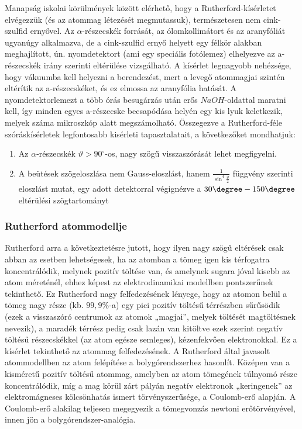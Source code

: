 \documentclass[a4paper,12pt]{article}
\begin{document}
Manapság iskolai körülmények között elérhető, hogy a Rutherford-kísérletet
elvégezzük (és az atommag létezését megmutassuk), természetesen nem
cink-szulfid ernyővel.
Az $\alpha$-részecskék forrását, az ólomkollimátort és az aranyfóliát
ugyanúgy alkalmazva, de a cink-szulfid ernyő helyett egy félkör alakban meghajlított, ún. nyomdetektort (ami egy speciális fotólemez)
elhelyezve az a-részecskék irány szerinti eltérülése vizsgálható. A kísérlet
legnagyobb nehézsége, hogy vákuumba kell helyezni a berendezést, mert
a levegő atommagjai szintén eltérítik az a-részecskéket, és ez elmossa az
aranyfólia hatását. A nyomdetektorlemezt a több órás besugárzás után erős
$NaOH$-oldattal maratni kell, így minden egyes a-részecske becsapódása helyén egy kis lyuk keletkezik, melyek száma mikroszkóp alatt megszámolható.
Összegezve a Rutherford-féle szóráskísérletek legfontosabb kisérleti tapasztalatait, a következőket mondhatjuk:
\begin{enumerate}
    \item Az $\alpha$-részecskék $\vartheta > 90^\circ$-os, nagy szögű visszaszórását lehet megfigyelni.
    \item A beütések szögeloszlása nem Gauss-eloszlást, hanem $\frac{1}{\sin^4\frac{\vartheta}{2}}$ függvény szerinti eloszlást mutat, egy adott detektorral végignézve a $30\degree- 150\degree$ eltérülési szögtartományt
\end{enumerate}

\subsubsection{Rutherford atommodellje}
Rutherford arra a következtetésre jutott, hogy ilyen nagy szögű eltérések
csak abban az esetben lehetségesek, ha az atomban a tömeg igen kis
térfogatra koncentrálódik, melynek pozitív töltése van, és amelynek
sugara jóval kisebb az atom méreténél, ehhez képest az elektrodinamikai
modellben pontszerűnek tekinthető.
Ez Rutherford nagy felfedezésének lényege, hogy az atomon belül a tömeg
nagy része (kb. $99{,}9\%$-a) egy pici pozitív töltésű térrészben
sűrűsödik (ezek a visszaszóró centrumok az atomok „magjai”,
melyek töltését magtöltésnek nevezik), a maradék térrész pedig csak
lazán van kitöltve ezek szerint negatív töltésű részecskékkel
(az atom egésze semleges), kézenfekvően elektronokkal.
Ez a kísérlet tekinthető az atommag felfedezésének.
A Rutherford által javasolt atommodellben az atom felépítése a
bolygórendszerhez hasonlít.
Középen van a kisméretű pozitív töltésű atommag, amelyben az atom
tömegének túlnyomó része koncentrálódik, míg a mag körül zárt pályán
negatív elektronok „keringenek” az elektromágneses kölcsönhatás ismert
törvényszerűsége, a Coulomb-erő alapján.
A Coulomb-erő alakilag teljesen megegyezik a tömegvonzás newtoni
erőtörvényével, innen jön a bolygórendszer-analógia.
\end{document}
